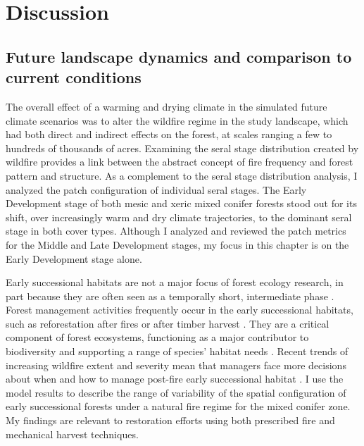 \section{Discussion}

\subsection*{Future landscape dynamics and comparison to current conditions}

The overall effect of a warming and drying climate in the simulated future climate scenarios was to alter the wildfire regime in the study landscape, which had both direct and indirect effects on the forest, at scales ranging a few to hundreds of thousands of acres. Examining the seral stage distribution created by wildfire provides a link between the abstract concept of fire frequency and forest pattern and structure. As a complement to the seral stage distribution analysis, I analyzed the patch configuration of individual seral stages. The Early Development stage of both mesic and xeric mixed conifer forests stood out for its shift, over increasingly warm and dry climate trajectories, to the dominant seral stage in both cover types. Although I analyzed and reviewed the patch metrics for the Middle and Late Development stages, my focus in this chapter is on the Early Development stage alone.

Early successional habitats are not a major focus of forest ecology research, in part because they are often seen as a temporally short, intermediate phase \citep{Swanson2011}. Forest management activities frequently occur in the early successional habitats, such as reforestation after fires or after timber harvest \citep{Stephens2010}. They are a critical component of forest ecosystems, functioning as a major contributor to biodiversity and supporting a range of species' habitat needs \citep{Chang1995,Hutto2008,Swanson2011}. Recent trends of increasing wildfire extent and severity mean that managers face more decisions about when and how to manage post-fire early successional habitat \citep{Stephens2013,Dellasala2014}. I use the model results to describe the range of variability of the spatial configuration of early successional forests under a natural fire regime for the mixed conifer zone. My findings are relevant to restoration efforts using both prescribed fire and mechanical harvest techniques. 

